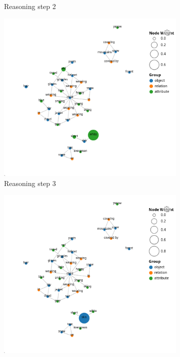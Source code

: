 \begin{figure}[htbp]
\begin{subfigure}[r]{0.4\textwidth}
        \caption{Reasoning step 2}
    \end{subfigure}
    \begin{subfigure}[l]{0.4\textwidth}
        \includegraphics[width=\textwidth]{figures/qav/qav_r2.png}
        \caption{Reasoning step 3}
    \end{subfigure}
    \begin{subfigure}[r]{0.4\textwidth}
        \includegraphics[width=\textwidth]{figures/qav/qav_r3.png}

\end{subfigure}
\end{figure}
